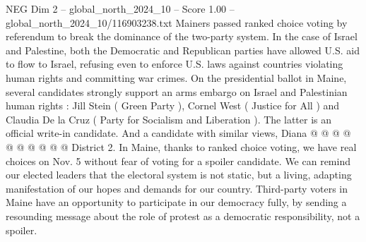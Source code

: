 \begin{textsample}{NEG Dim 2 – global\_north\_2024\_10 – Score 1.00 – global\_north\_2024\_10/116903238.txt}
Mainers passed ranked choice voting by referendum to break the dominance of the two-party system.
In the case of Israel and Palestine, both the Democratic and Republican parties have allowed U.S. aid to flow to Israel, refusing even to enforce U.S. laws against countries violating human rights and committing war crimes.
On the presidential ballot in Maine, several candidates strongly support an arms embargo on Israel and Palestinian human rights : Jill Stein ( Green Party ), Cornel West ( Justice for All ) and Claudia De la Cruz ( Party for Socialism and Liberation ).
The latter is an official write-in candidate.
And a candidate with similar views, Diana @ @ @ @ @ @ @ @ @ @ District 2.
In Maine, thanks to ranked choice voting, we have real choices on Nov. 5 without fear of voting for a spoiler candidate.
We can remind our elected leaders that the electoral system is not static, but a living, adapting manifestation of our hopes and demands for our country.
Third-party voters in Maine have an opportunity to participate in our democracy fully, by sending a resounding message about the role of protest as a democratic responsibility, not a spoiler.

\end{textsample}
